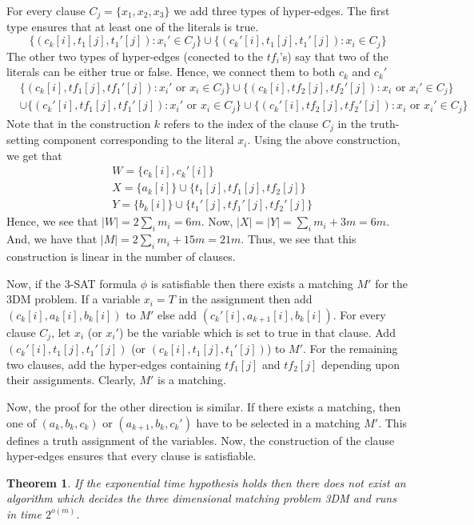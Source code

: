 \documentclass[12pt]{article}
\newtheorem{theorem}{Theorem}
\begin{document}
For every clause $C_j = \{x_1, x_2, x_3\}$ we add three types of hyper-edges.  The first type ensures that at least one of the literals is true. 
$$\{(c_k[i], t_1[j], t_1'[j]): x_i' \in C_j\} \cup \{(c_k'[i], t_1[j], t_1'[j]): x_i \in C_j\}$$ 
The other two types of hyper-edges (conected to the $tf_i$'s) say that two of the literals can be either true or false. Hence, we connect them to both $c_k$ and $c_k'$
\begin{align*}
  &\{(c_k[i], tf_1[j], tf_1'[j]): x_i' \text{ or }x_i\in C_j\} \cup \{(c_k[i], tf_2[j], tf_2'[j]): x_i \text{ or }x_i' \in C_j\}\\
  &\cup \{(c_k'[i], tf_1[j], tf_1'[j]): x_i' \text{ or }x_i\in C_j\} \cup \{(c_k'[i], tf_2[j], tf_2'[j]): x_i \text{ or }x_i' \in C_j\}
\end{align*}
Note that in the construction $k$ refers to the index of the clause $C_j$ in the truth-setting component corresponding to the literal $x_i$. Using the above construction, we get that
\begin{align*}
  & W = \{c_k[i], c_k'[i]\}\\
  & X = \{a_k[i]\} \cup \{t_1[j], tf_1[j], tf_2[j]\}\\
  & Y = \{b_k[i]\} \cup \{t_1'[j], tf_1'[j], tf_2'[j]\}
\end{align*} 
Hence, we see that $|W| = 2\sum_i m_i = 6m$. Now, $|X| = |Y| = \sum_i m_i + 3m = 6m$. And, we have that $|M| = 2\sum_i m_i + 15m = 21m$. Thus, we see that this construction is linear in the number of clauses. 

Now, if the 3-SAT formula $\phi$ is satisfiable then there exists a matching $M'$ for the 3DM problem. If a variable $x_i = T$ in the assignment then add $(c_k[i], a_k[i], b_k[i])$ to $M'$ else add $(c_k'[i], a_{k+1}[i], b_k[i])$. For every clause $C_j$, let $x_i$ (or $x_i'$) be the variable which is set to true in that clause. Add $(c_k'[i], t_1[j], t_1'[j])$  (or $(c_k[i], t_1[j], t_1'[j])$) to $M'$. For the remaining two clauses, add the hyper-edges containing $tf_1[j]$ and $tf_2[j]$ depending upon their assignments. Clearly, $M'$ is a matching. 

Now, the proof for the other direction is similar. If there exists a matching, then one of $(a_k, b_k, c_k)$ or $(a_{k+1}, b_k, c_k')$ have to be selected in a matching $M'$. This defines a truth assignment of the variables. Now, the construction of the clause hyper-edges ensures that every clause is satisfiable.

\begin{theorem}
If the exponential time hypothesis holds then there does not exist an algorithm which decides the three dimensional matching problem 3DM and runs in time $2^{o(m)}$.
\end{theorem}
\end{document}
